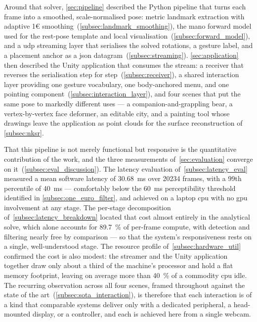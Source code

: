 Around that solver, \autoref{sec:pipeline} described the Python pipeline that turns
each frame into a smoothed, scale-normalised pose: metric landmark extraction with
adaptive 1\euro{} smoothing~(\autoref{subsec:landmark_smoothing}), the \acrshort{mano}
forward model used for the rest-pose template and local
visualisation~(\autoref{subsec:forward_model}), and a \acrshort{udp} streaming layer
that serialises the solved rotations, a gesture label, and a placement anchor as a
\acrshort{json} datagram~(\autoref{subsec:streaming}). \autoref{sec:application} then
described the Unity application that consumes the stream: a receiver that reverses the
serialisation step for step~(\autoref{subsec:receiver}), a shared interaction layer
providing one gesture vocabulary, one body-anchored menu, and one pointing
component~(\autoref{subsec:interaction_layer}), and four scenes that put the same pose
to markedly different uses --- a companion-and-grappling bear, a vertex-by-vertex face
deformer, an editable city, and a painting tool whose drawings leave the application
as point clouds for the surface reconstruction of \autoref{subsec:nksr}.

That this pipeline is not merely functional but responsive is the quantitative
contribution of the work, and the three measurements of~\autoref{sec:evaluation}
converge on it~(\autoref{subsec:eval_discussion}). The latency evaluation
of~\autoref{subsec:latency_eval}
measured a mean software latency of \SI{30.68}{\ms} over \num{20234}
frames, with a 99th percentile of \SI{40}{\ms} --- comfortably below the \SI{60}{\ms}
perceptibility threshold identified in \autoref{subsec:one_euro_filter}, and achieved
on a laptop \acrshort{cpu} with no \acrshort{gpu} involvement at any stage. The
per-stage decomposition of~\autoref{subsec:latency_breakdown}
located that cost almost entirely in the analytical solve,
which alone accounts for \SI{89.7}{\percent} of per-frame compute,
with detection and filtering nearly free by comparison --- so that the system's
responsiveness rests on a single, well-understood stage. The resource profile
of~\autoref{subsec:hardware_util} confirmed the cost is also modest: the streamer and
the Unity application together draw only about a third of the machine's processor and
hold a flat memory footprint, leaving on average more than \SI{40}{\percent} of a
commodity \acrshort{cpu} idle. The
recurring observation across all four scenes, framed throughout against the state of
the art~(\autoref{subsec:sota_interaction}), is therefore that each interaction is of
a kind that comparable systems deliver only with a dedicated peripheral, a
head-mounted display, or a controller, and each is achieved here from a single webcam.

